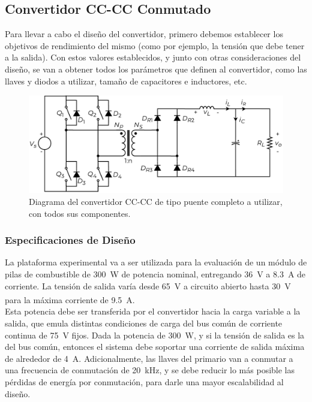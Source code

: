\subsection{Convertidor CC-CC Conmutado}

Para llevar a cabo el diseño del convertidor, primero debemos establecer los objetivos de rendimiento del mismo (como por ejemplo, la tensión que debe tener a la salida). Con estos valores establecidos, y junto con otras consideraciones del diseño, se van a obtener todos los parámetros que definen al convertidor, como las llaves y diodos a utilizar, tamaño de capacitores e inductores, etc.\\

\begin{figure}[h]
    \centering
    \includegraphics[scale=0.6]{Imagenes/Full Bridge.pdf}
    \caption{Diagrama del convertidor CC-CC de tipo puente completo a utilizar, con todos sus componentes.}
    \label{puente_completo}
\end{figure}

\subsubsection{Especificaciones de Diseño}

La plataforma experimental va a ser utilizada para la evaluación de un módulo de pilas de combustible de \SI[]{300}[]{\watt} de potencia nominal, entregando \SI[]{36}[]{\volt} a \SI[]{8.3}[]{\ampere} de corriente. La tensión de salida varía desde \SI[]{65}[]{\volt} a circuito abierto hasta \SI[]{30}[]{\volt} para la máxima corriente de \SI[]{9.5}[]{\ampere}.\textsuperscript{\cite{HSeriesBrochure}}\\

Esta potencia debe ser transferida por el convertidor hacia la carga variable a la salida, que emula distintas condiciones de carga del bus común de corriente continua de \SI[]{75}[]{\volt} fijos. Dada la potencia de \SI[]{300}[]{\watt}, y si la tensión de salida es la del bus común, entonces el sistema debe soportar una corriente de salida máxima de alrededor de \SI[]{4}[]{\ampere}. Adicionalmente, las llaves del primario van a conmutar a una frecuencia de conmutación de \SI[]{20}[]{\kilo\hertz}, y se debe reducir lo más posible las pérdidas de energía por conmutación, para darle una mayor escalabilidad al diseño.\\

